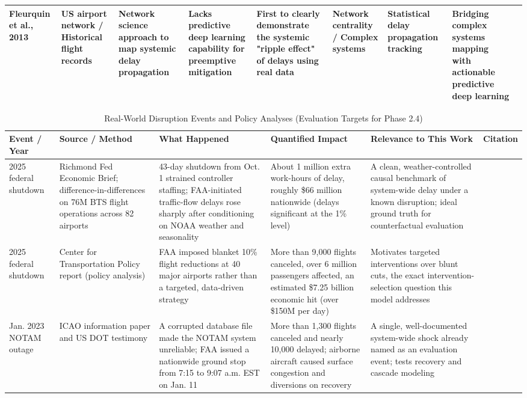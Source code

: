 \documentclass[twocolumn]{article}
\begin{document}
\begin{table}[htbp]
\begin{tabular}{|p{1.5cm}|p{1.5cm}|p{2.5cm}|p{2cm}|p{2cm}|p{1.5cm}|p{1.5cm}|p{1.5cm}|p{1cm}|}
\hline
Fleurquin et al., 2013 & US airport network / Historical flight records & Network science approach to map systemic delay propagation & Lacks predictive deep learning capability for preemptive mitigation & First to clearly demonstrate the systemic "ripple effect" of delays using real data & Network centrality / Complex systems & Statistical delay propagation tracking & Bridging complex systems mapping with actionable predictive deep learning & \cite{fleurquin2013}\\
\hline
\end{tabular}
\end{table}

\begin{table}[htbp]
\centering
\setlength{\tabcolsep}{0.8\tabcolsep}
\def\arraystretch{1.5}
\caption{Real-World Disruption Events and Policy Analyses (Evaluation Targets for Phase 2.4)}
\begin{tabular}{|p{2.2cm}|p{2.6cm}|p{3.2cm}|p{3.2cm}|p{2.8cm}|p{1cm}|}
\rowcolor{gray!25}
\hline
\textbf{Event / Year} & \textbf{Source / Method} & \textbf{What Happened} & \textbf{Quantified Impact} & \textbf{Relevance to This Work} & \textbf{Citation} \\
\hline
2025 federal shutdown & Richmond Fed Economic Brief; difference-in-differences on 76M BTS flight operations across 82 airports & 43-day shutdown from Oct. 1 strained controller staffing; FAA-initiated traffic-flow delays rose sharply after conditioning on NOAA weather and seasonality & About 1 million extra work-hours of delay, roughly \$66 million nationwide (delays significant at the 1\% level) & A clean, weather-controlled causal benchmark of system-wide delay under a known disruption; ideal ground truth for counterfactual evaluation & \cite{richmondfed2025}\\
\hline
2025 federal shutdown & Center for Transportation Policy report (policy analysis) & FAA imposed blanket 10\% flight reductions at 40 major airports rather than a targeted, data-driven strategy & More than 9,000 flights canceled, over 6 million passengers affected, an estimated \$7.25 billion economic hit (over \$150M per day) & Motivates targeted interventions over blunt cuts, the exact intervention-selection question this model addresses & \cite{ctp2026}\\
\hline
Jan. 2023 NOTAM outage & ICAO information paper and US DOT testimony & A corrupted database file made the NOTAM system unreliable; FAA issued a nationwide ground stop from 7:15 to 9:07 a.m. EST on Jan. 11 & More than 1,300 flights canceled and nearly 10,000 delayed; airborne aircraft caused surface congestion and diversions on recovery & A single, well-documented system-wide shock already named as an evaluation event; tests recovery and cascade modeling & \cite{icao2023notam}\\

\end{tabular}
\end{table}
\end{document}
